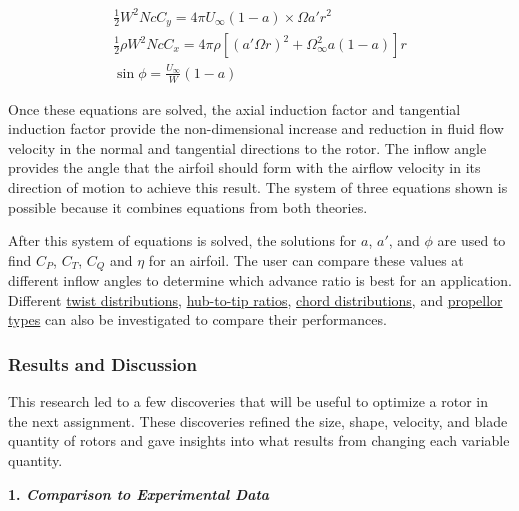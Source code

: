 \documentclass{article}
\begin{document}
\begin{equation}
\begin{aligned}
	\frac{1}{2} W^{2} N c C_{y} = 4 \pi U_{\infty} (1 - a) \times \Omega a' r^{2} \\
	\frac{1}{2} \rho W^{2} N c C_{x} = 4 \pi \rho [(a' \Omega r)^{2} + \Omega^{2}_{\infty} a (1 - a)] r \\
	\sin \phi = \frac{U_{\infty}}{W} (1 - a)
\end{aligned}
\end{equation}

Once these equations are solved, the axial induction factor and tangential induction factor provide the non-dimensional increase and reduction in fluid flow velocity in the normal and tangential directions to the rotor. The inflow angle provides the angle that the airfoil should form with the airflow velocity in its direction of motion to achieve this result. The system of three equations shown is possible because it combines equations from both theories. \newline

After this system of equations is solved, the solutions for $a$, $a'$, and $\phi$ are used to find $C_{P}$, $C_{T}$, $C_{Q}$ and $\eta$ for an airfoil. The user can compare these values at different inflow angles to determine which advance ratio is best for an application. Different \hyperlink{T}{twist distributions}, \hyperlink{D/D}{hub-to-tip ratios}, \hyperlink{c}{chord distributions}, and \hyperlink{APC}{propellor types} can also be investigated to compare their performances. \newline

\subsubsection*{Results and Discussion}

This research led to a few discoveries that will be useful to optimize a rotor in the next assignment. These discoveries refined the size, shape, velocity, and blade quantity of rotors and gave insights into what results from changing each variable quantity. \newline

\textbf{1. \emph{Comparison to Experimental Data}} \newline
\end{document}
